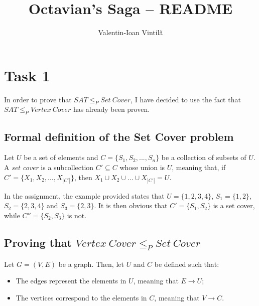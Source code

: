 \documentclass[runningheads]{llncs}
\begin{document}
%
\title{Octavian's Saga -- README}
%
%
\author{Valentin-Ioan Vintilă}


\maketitle

\section{Task 1}

In order to prove that $SAT\leq_P Set\ Cover$, I have decided to use the fact that $SAT\leq_P Vertex\ Cover$ has already been proven.

\subsection{Formal definition of the Set Cover problem}

Let $U$ be a set of elements and $C=\{S_1,S_2,...,S_n\}$ be a collection of subsets of $U$. A \textit{set cover} is a subcollection $C'\subseteq C$ whose union is $U$, meaning that, if $C'=\{X_1,X_2,\hdots,X_{|C'|}\}$, then $X_1\cup X_2\cup\hdots\cup X_{|C'|}=U$.

In the assignment, the example provided states that $U=\{1,2,3,4\}$, $S_1=\{1,2\}$, $S_2=\{2,3,4\}$ and $S_3=\{2,3\}$. It is then obvious that $C'=\{S_1,S_2\}$ is a set cover, while $C''=\{S_2,S_3\}$ is not.

\subsection{Proving that $Vertex\ Cover \leq_P Set\ Cover$}

Let $G=(V,E)$ be a graph. Then, let $U$ and $C$ be defined such that:
\begin{itemize}
	\item The edges represent the elements in $U$, meaning that $E\to U$;
	\item The vertices correspond to the elements in $C$, meaning that $V\to C$.
\end{itemize}
\end{document}
